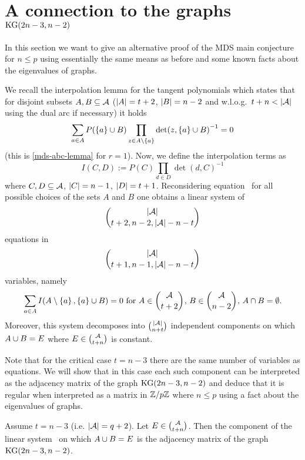\section{A connection to the  graphs $\mathop\mathrm{KG}(2n-3,n-2)$}%
\makeatletter%
\def\@currentlabel{Section \thesection}%
\makeatother%
\label{sec-mds-knes}

In this section we want to give an alternative proof of the MDS main conjecture for $n\leq p$ using essentially the same means as before and some known facts about the eigenvalues of  graphs.

We recall the interpolation lemma for the tangent polynomials which states that for disjoint subsets $A,B\subseteq \mathcal{A}$ ($\left\vert{A}\right\vert=t+2$, $\left\vert{B}\right\vert=n-2$ and w.l.o.g.~$t+n < \left\vert{\mathcal{A}}\right\vert$ using the dual arc if necessary)
it holds
$$
\sum_{a\in A}{P(\set a\setjoin B)\prod_{z\in A\setminus \set a}{\det(z,\set a\setjoin B)}^{-1}}=0\label{mds-tan-poly-interpol}
$$
(this is \autoref{mds-abc-lemma} for $r=1$). Now, we define the interpolation terms as
$$
I(C,D):=P(C)\prod_{d\in D}{{\det(d,C)}^{-1}}
$$
where $C,D\subseteq \mathcal{A}$, $\left\vert{C}\right\vert=n-1$, $\left\vert{D}\right\vert=t+1$.
Reconsidering equation~ %
for all possible choices of the sets $A$ and $B$ one obtains a linear system of
$$
\binom{\card\cA}{t+2,n-2,\card\cA-n-t}
$$
equations in
$$
\binom{\card\cA}{t+1,n-1,\card\cA-n-t}
$$
variables, namely
$$%
\sum_{a\in A}{I(A\setminus\set{a}, \set{a}\setjoin B)}=0\text{ for $A\in\binom{\cA}{t+2}$, $B\in\binom{\cA}{n-2}$, $A\setmeet B=\emptyset$}.\label{mds-interpol-sys}
$$
Moreover, this system decomposes into $\binom{\card\cA}{n+t}$ independent components on which $A\cup B=E$ where $E\in\binom{\cA}{t+n}$ is constant.

Note that for the critical case $t=n-3$ there are the same number of variables as equations.
We will show that in this case each such component can be interpreted as the adjacency matrix of the  graph $\mathop\mathrm{KG}(2n-3,n-2)$ and deduce that it is regular when interpreted as a matrix in $\mathbb{Z}/p\mathbb{Z}$ where $n\leq p$ using a fact about the eigenvalues of  graphs.

\begin{lemma}
    Assume $t=n-3$ (i.e. $\left\vert{\mathcal{A}}\right\vert=q+2$).
    Let $E\in\binom{\cA}{t+n}$. Then the component of the linear system~
    on which $A\cup B=E$ is the adjacency matrix of the graph $\mathop\mathrm{KG}(2n-3,n-2)$.
\end{lemma} 

